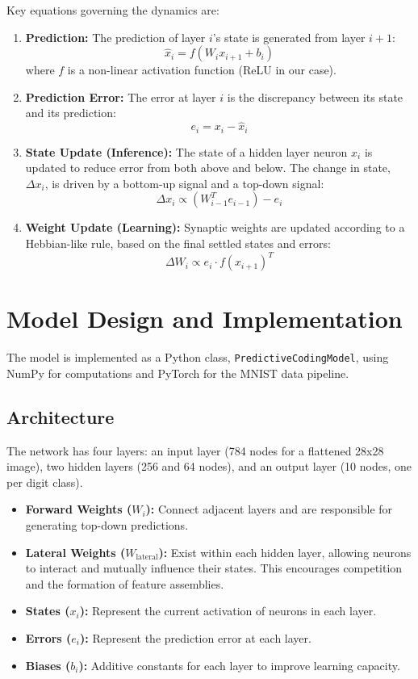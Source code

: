 \documentclass[a4paper,12pt]{article}
\begin{document}
Key equations governing the dynamics are:
\begin{enumerate}
    \item \textbf{Prediction:} The prediction of layer $i$'s state is generated from layer $i+1$: 
    \[ \hat{x}_i = f(W_i x_{i+1} + b_i) \]
    where $f$ is a non-linear activation function (ReLU in our case).

    \item \textbf{Prediction Error:} The error at layer $i$ is the discrepancy between its state and its prediction:
    \[ e_i = x_i - \hat{x}_i \]

    \item \textbf{State Update (Inference):} The state of a hidden layer neuron $x_i$ is updated to reduce error from both above and below. The change in state, $\Delta x_i$, is driven by a bottom-up signal and a top-down signal:
    \[ \Delta x_i \propto (W_{i-1}^T e_{i-1}) - e_i \]
    
    \item \textbf{Weight Update (Learning):} Synaptic weights are updated according to a Hebbian-like rule, based on the final settled states and errors:
    \[ \Delta W_i \propto e_i \cdot f(x_{i+1})^T \]
\end{enumerate}

\section{Model Design and Implementation}
The model is implemented as a Python class, \texttt{PredictiveCodingModel}, using NumPy for computations and PyTorch for the MNIST data pipeline.

\subsection{Architecture}
The network has four layers: an input layer (784 nodes for a flattened 28x28 image), two hidden layers (256 and 64 nodes), and an output layer (10 nodes, one per digit class).
\begin{itemize}
    \item \textbf{Forward Weights ($W_i$):} Connect adjacent layers and are responsible for generating top-down predictions.
    \item \textbf{Lateral Weights ($W_{\text{lateral}}$):} Exist within each hidden layer, allowing neurons to interact and mutually influence their states. This encourages competition and the formation of feature assemblies.
    \item \textbf{States ($x_i$):} Represent the current activation of neurons in each layer.
    \item \textbf{Errors ($e_i$):} Represent the prediction error at each layer.
    \item \textbf{Biases ($b_i$):} Additive constants for each layer to improve learning capacity.
\end{itemize}
\end{document}
